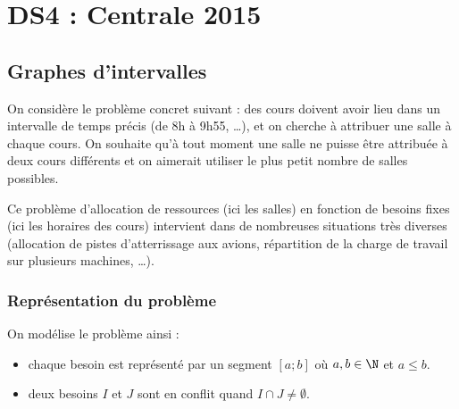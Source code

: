 \chapter{DS4 : Centrale 2015}
\section{Graphes d'intervalles}
On considère le problème concret suivant : des cours doivent avoir
lieu dans un intervalle de temps précis (de 8h à 9h55, \dots), et on cherche à
attribuer une salle à chaque cours. On souhaite qu'à tout moment une
salle ne puisse être attribuée à deux cours différents et on aimerait
utiliser le plus petit nombre de salles possibles.

Ce problème d'allocation de ressources (ici les salles) en fonction de
besoins fixes (ici les horaires des cours) intervient dans de
nombreuses situations très diverses (allocation de pistes
d'atterrissage aux avions, répartition de la charge de travail sur
plusieurs machines, \dots).
\subsection{Représentation du problème}
On modélise le problème ainsi :
\begin{itemize}
\item chaque besoin est représenté par un segment $[a; b]$ où
  $a,b\in \N$ et $a\le b$.
\item deux besoins $I$ et $J$ sont en conflit quand $I\cap J\ne
  \emptyset$.
\end{itemize}

